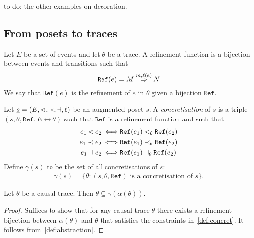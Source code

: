 \begin{mdframed}[backgroundcolor=blue!20]
to do: the other examples on decoration.
\end{mdframed}



\subsection{From posets to traces}

\begin{definition}
  Let $E$ be a set of events and let $\theta$ be a trace. A refinement function is a bijection between events and transitions such that
  \[
  \mathtt{Ref}(e) = M\overset{m,\ell(e)}{\Rightarrow}N
  \]
  We say that $\mathtt{Ref}(e)$ is the refinement of $e$ in $\theta$ given a bijection $\mathtt{Ref}$.
\end{definition}

\begin{definition}
  \label{def:concret}
  Let $\underline s=(E,\lessdot,\prec,\dashv,\ell)$ be an augmented poset $s$.
  A \emph{concretisation} of $s$ is a triple $(s,\theta,\mathtt{Ref}:E\leftrightarrow\theta)$ such that $\mathtt{Ref}$ is a refinement function and such that
  \begin{align*}
    e_1\lessdot e_2 \iff& \mathtt{Ref}(e_1) <_{\theta}\mathtt{Ref}(e_2)\\
    e_1\prec e_2 \iff& \mathtt{Ref}(e_1) \prec_{\theta}\mathtt{Ref}(e_2)\\
    e_1\dashv e_2 \iff& \mathtt{Ref}(e_1) \dashv_{\theta}\mathtt{Ref}(e_2)
  \end{align*}
  Define $\gamma(s)$ to be the set of all concretisations of $s$:
  \begin{align*}
    \gamma(s) = \{\theta: (s,\theta,\mathtt{Ref})\text{ is a concretisation of }s\}.
  \end{align*}
\end{definition}

\begin{theorem}
  Let $\theta$ be a causal trace. Then $\theta\subseteq\gamma(\alpha(\theta))$.
\end{theorem}
\begin{proof}
  Suffices to show that for any causal trace $\theta$ there exists a refinement bijection between $\alpha(\theta)$ and $\theta$ that satisfies the constraints in~\autoref{def:concret}. It follows from~\autoref{def:abstraction}.
\end{proof}

